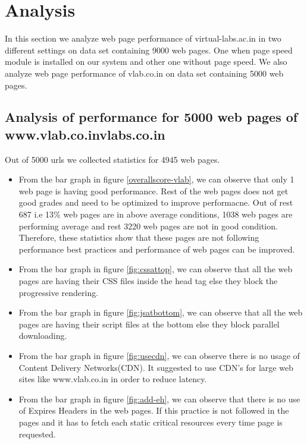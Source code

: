 \documentclass[conference]{IEEEtran}
\begin{document}
\section{Analysis}\label{sec-6}
In this section we analyze web page performance of virtual-labs.ac.in in two different settings on data set containing 9000 web pages.
One when page speed module is installed on our system and other one without page speed. We also analyze web page performance of vlab.co.in  
on data set containing 5000 web pages.
\subsection{Analysis of performance for 5000 web pages of www.vlab.co.invlabs.co.in}
 Out of 5000 urls we collected statistics for 4945 web pages. 
\begin{itemize}
\item From the bar graph in figure \ref{overallscore-vlab}, we can observe that only 1 web page is having good
performance. Rest of the web pages does not get good grades and need to be
optimized to improve performacne. Out of rest 687 i.e 13\% web pages are in above average conditions, 1038
web pages are performing average and rest 3220 web pages are not in good
condition. Therefore, these statistics show that these pages are not following
performance best practices and performance of web pages can be improved.  
 
\item From the bar graph in figure \ref{fig:cssattop}, we can observe that all the web pages are having their
CSS files inside the head tag else they block the progressive rendering.

\item From the bar graph in figure \ref{fig:jsatbottom}, we can observe that all the web pages are having their
script files at the bottom else they block parallel downloading.

\item From the bar graph in figure \ref{fig:usecdn}, we can observe there is no usage of Content Delivery
Networks(CDN). It suggested to use CDN's for large web sites like www.vlab.co.in in order to reduce latency.

\item From the bar graph in figure \ref{fig:add-eh}, we can observe that there is no use of Expires
Headers in the web pages. If this practice is not followed in the pages and it has to
fetch each static critical resources every time page is requested.


\end{itemize}
\end{document}
